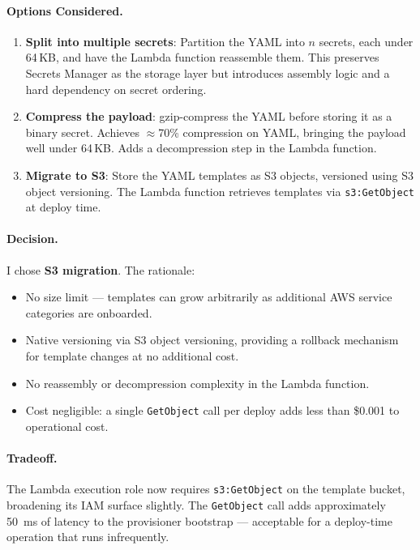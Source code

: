 \paragraph{Options Considered.}

\begin{enumerate}
    \item \textbf{Split into multiple secrets}: Partition the YAML
          into $n$ secrets, each under 64\,KB, and have the Lambda
          function reassemble them. This preserves Secrets Manager
          as the storage layer but introduces assembly logic and
          a hard dependency on secret ordering.

    \item \textbf{Compress the payload}: gzip-compress the YAML before
          storing it as a binary secret. Achieves $\approx$70\%
          compression on YAML, bringing the payload well under 64\,KB.
          Adds a decompression step in the Lambda function.

    \item \textbf{Migrate to S3}: Store the YAML templates as S3 objects,
          versioned using S3 object versioning. The Lambda function
          retrieves templates via \texttt{s3:GetObject} at deploy time.
\end{enumerate}

\paragraph{Decision.} I chose \textbf{S3 migration}. The rationale:

\begin{itemize}
    \item No size limit --- templates can grow arbitrarily as additional
          AWS service categories are onboarded.
    \item Native versioning via S3 object versioning, providing a rollback
          mechanism for template changes at no additional cost.
    \item No reassembly or decompression complexity in the Lambda function.
    \item Cost negligible: a single \texttt{GetObject} call per deploy
          adds less than \$0.001 to operational cost.
\end{itemize}

\paragraph{Tradeoff.}
The Lambda execution role now requires \texttt{s3:GetObject} on the
template bucket, broadening its IAM surface slightly. The
\texttt{GetObject} call adds approximately 50~ms of latency to the
provisioner bootstrap --- acceptable for a deploy-time operation
that runs infrequently.

